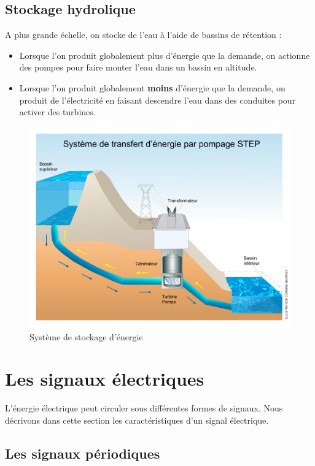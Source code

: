 \documentclass[10pt,fleqn]{article} %
\begin{document}
    \subsection{Stockage hydrolique}

    A plus grande échelle, on stocke de l'eau à l'aide de bassins de rétention :
    \begin{itemize}
        \item Lorsque l'on produit globalement plus d'énergie que la demande, on actionne des pompes pour faire monter l'eau dans un bassin en altitude.
        \item Lorsque l'on produit globalement \textbf{moins} d'énergie que la demande, on produit de l'électricité en faisant descendre l'eau dans des conduites pour activer des turbines.
    \end{itemize}

    \begin{figure}[h]
        \centering
        \includegraphics[width=\textwidth]{images/hydrau}
        \caption{Système de stockage d'énergie}
        \label{fig:hydrau}
    \end{figure}


    \section{Les signaux électriques}
    L'énergie électrique peut circuler sous différentes formes de signaux. Nous décrivons dans cette section les caractéristiques d'un signal électrique.

    \subsection{Les signaux périodiques}
\end{document}
